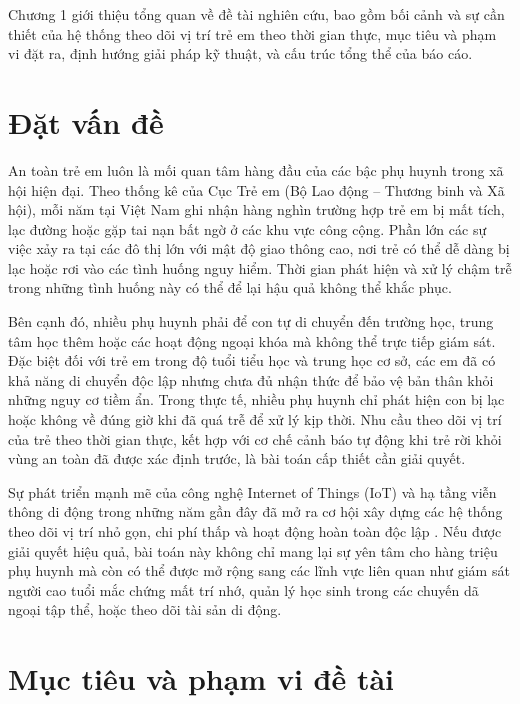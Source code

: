 \documentclass[../DoAn.tex]{subfiles}
\begin{document}
Chương 1 giới thiệu tổng quan về đề tài nghiên cứu, bao gồm bối cảnh và sự cần thiết của hệ thống theo dõi vị trí trẻ em theo thời gian thực, mục tiêu và phạm vi đặt ra, định hướng giải pháp kỹ thuật, và cấu trúc tổng thể của báo cáo.

\section{Đặt vấn đề}
\label{section:1.1}

An toàn trẻ em luôn là mối quan tâm hàng đầu của các bậc phụ huynh trong xã hội hiện đại. Theo thống kê của Cục Trẻ em (Bộ Lao động – Thương binh và Xã hội), mỗi năm tại Việt Nam ghi nhận hàng nghìn trường hợp trẻ em bị mất tích, lạc đường hoặc gặp tai nạn bất ngờ ở các khu vực công cộng. Phần lớn các sự việc xảy ra tại các đô thị lớn với mật độ giao thông cao, nơi trẻ có thể dễ dàng bị lạc hoặc rơi vào các tình huống nguy hiểm. Thời gian phát hiện và xử lý chậm trễ trong những tình huống này có thể để lại hậu quả không thể khắc phục.

Bên cạnh đó, nhiều phụ huynh phải để con tự di chuyển đến trường học, trung tâm học thêm hoặc các hoạt động ngoại khóa mà không thể trực tiếp giám sát. Đặc biệt đối với trẻ em trong độ tuổi tiểu học và trung học cơ sở, các em đã có khả năng di chuyển độc lập nhưng chưa đủ nhận thức để bảo vệ bản thân khỏi những nguy cơ tiềm ẩn. Trong thực tế, nhiều phụ huynh chỉ phát hiện con bị lạc hoặc không về đúng giờ khi đã quá trễ để xử lý kịp thời. Nhu cầu theo dõi vị trí của trẻ theo thời gian thực, kết hợp với cơ chế cảnh báo tự động khi trẻ rời khỏi vùng an toàn đã được xác định trước, là bài toán cấp thiết cần giải quyết.

Sự phát triển mạnh mẽ của công nghệ Internet of Things (IoT) và hạ tầng viễn thông di động trong những năm gần đây đã mở ra cơ hội xây dựng các hệ thống theo dõi vị trí nhỏ gọn, chi phí thấp và hoạt động hoàn toàn độc lập \cite{iot_survey}. Nếu được giải quyết hiệu quả, bài toán này không chỉ mang lại sự yên tâm cho hàng triệu phụ huynh mà còn có thể được mở rộng sang các lĩnh vực liên quan như giám sát người cao tuổi mắc chứng mất trí nhớ, quản lý học sinh trong các chuyến dã ngoại tập thể, hoặc theo dõi tài sản di động.

\section{Mục tiêu và phạm vi đề tài}
\label{section:1.2}
\end{document}
